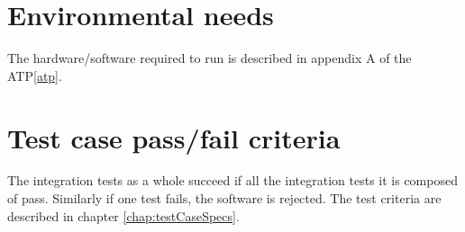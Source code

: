 \section{Environmental needs}
The hardware/software required to run \applicationname{} is described in appendix A of the ATP\ref{atp}.

\section{Test case pass/fail criteria}
The integration tests as a whole succeed if all the integration tests it is composed of pass. Similarly if one test fails, the software is rejected.
The test criteria are described in chapter \ref{chap:testCaseSpecs}.
